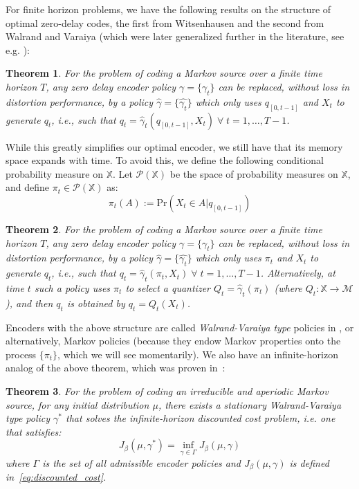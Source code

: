 \documentclass[conference]{IEEEtran}
\newtheorem{theorem}{Theorem}[section]
\begin{document}
For finite horizon problems, we have the following results on the structure of optimal zero-delay codes, the first from Witsenhausen and the second from Walrand and Varaiya (which were later generalized further in the literature, see e.g. \cite{MahTen09,Teneketzis,YukIT2010arXiv}):

\begin{theorem}\cite{Witsenhausen}
    For the problem of coding a Markov source over a finite time horizon \(T\), any zero delay encoder policy \(\gamma=\{\gamma_t\}\) can be replaced, without loss in distortion performance, by a policy \(\hat{\gamma}=\{\hat{\gamma_t}\}\) which only uses \(q_{[0,t-1]}\) and \(X_t\) to generate \(q_t\), i.e., such that \(q_t = \hat{\gamma}_t(q_{[0,t-1]}, X_t) \; \forall \; t = 1,\ldots,T-1\).
\end{theorem}

While this greatly simplifies our optimal encoder, we still have that its memory space expands with time. To avoid this, we define the following conditional probability measure on \(\mathbb{X}\). Let \(\mathcal{P}(\mathbb{X})\) be the space of probability measures on \(\mathbb{X}\), and define \(\pi_t \in \mathcal{P}(\mathbb{X})\) as:
\[\pi_t(A) := \text{Pr}(X_t \in A | q_{[0,t-1]})\]
\begin{theorem}\label{theorem:Walrand}\cite{Walrand}
    For the problem of coding a Markov source over a finite time horizon \(T\), any zero delay encoder policy \(\gamma=\{\gamma_t\}\) can be replaced, without loss in distortion performance, by a policy \(\hat{\gamma}=\{\hat{\gamma_t}\}\) which only uses \(\pi_t\) and \(X_t\) to generate \(q_t\), i.e., such that \(q_t = \hat{\gamma}_t(\pi_t, X_t) \; \forall \; t = 1,\ldots,T-1\). Alternatively, at time \(t\) such a policy uses \(\pi_t\) to select a quantizer \(Q_t = \hat{\gamma}_t(\pi_t)\) (where \(Q_t : \mathbb{X} \to \mathcal{M}\)), and then \(q_t\) is obtained by \(q_t = Q_t(X_t)\).
\end{theorem}

Encoders with the above structure are called \emph{Walrand-Varaiya type} policies in \cite{Linder,Wood}, or alternatively, Markov policies (because they endow Markov properties onto the process \(\{\pi_t\}\), which we will see momentarily). We also have an infinite-horizon analog of the above theorem, which was proven in~\cite{Wood}:

\begin{theorem}\label{theorem:Wood}\cite[Proposition 2]{Wood}
    For the problem of coding an irreducible and aperiodic Markov source, for any initial distribution \(\mu\), there exists a stationary Walrand-Varaiya type policy \(\gamma^*\) that solves the infinite-horizon discounted cost problem, i.e. one that satisfies:
    \[J_\beta(\mu,\gamma^*) = \inf_{\gamma \in \Gamma}J_\beta(\mu,\gamma)\]
    where \(\Gamma\) is the set of all admissible encoder policies and \(J_\beta(\mu,\gamma)\) is defined in~\eqref{eq:discounted_cost}.
\end{theorem}
\end{document}
